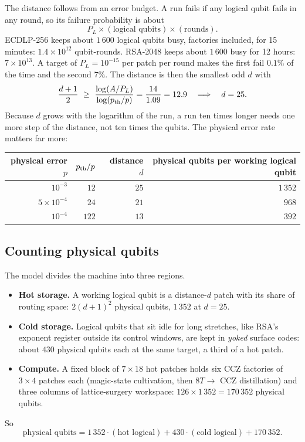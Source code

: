 The distance follows from an error budget. A run fails if any logical qubit fails in any round, so
its failure probability is about
\[ P_L\times(\text{logical qubits})\times(\text{rounds}) . \]
ECDLP-256 keeps about $1\,600$ logical qubits busy, factories included, for 15 minutes:
$1.4\times10^{12}$ qubit-rounds. RSA-2048 keeps about $1\,600$ busy for 12 hours:
$7\times10^{13}$. A target of $P_L=10^{-15}$ per patch per round makes the first fail $0.1\%$ of
the time and the second $7\%$. The distance is then the smallest odd $d$ with
\[ \frac{d+1}{2}\ \ge\ \frac{\log(A/P_L)}{\log(p_{\rm th}/p)}=\frac{14}{1.09}=12.9
   \quad\Longrightarrow\quad d=25 . \]
Because $d$ grows with the logarithm of the run, a run ten times longer needs one more step of the
distance, not ten times the qubits. The physical error rate matters far more:

\begin{center}\small
\begin{tabular}{rrrr}
\toprule
physical error $p$ & $p_{\rm th}/p$ & distance $d$ & physical qubits per working logical qubit\\
\midrule
$10^{-3}$ & $12$ & $25$ & $1\,352$\\
$5\times10^{-4}$ & $24$ & $21$ & $968$\\
$10^{-4}$ & $122$ & $13$ & $392$\\
\bottomrule
\end{tabular}
\end{center}

\subsection{Counting physical qubits}

The model divides the machine into three regions.
\begin{itemize}\setlength\itemsep{2pt}
\item \textbf{Hot storage.} A working logical qubit is a distance-$d$ patch with its share of
routing space: $2(d+1)^2$ physical qubits, $1\,352$ at $d=25$.
\item \textbf{Cold storage.} Logical qubits that sit idle for long stretches, like RSA's exponent
register outside its control windows, are kept in \emph{yoked} surface codes: about $430$ physical
qubits each at the same target, a third of a hot patch.
\item \textbf{Compute.} A fixed block of $7\times18$ hot patches holds six CCZ factories of
$3\times4$ patches each (magic-state cultivation, then $8T\to$ CCZ distillation) and three columns of
lattice-surgery workspace: $126\times1\,352=170\,352$ physical qubits.
\end{itemize}
So
\[ \text{physical qubits}=1\,352\cdot(\text{hot logical})+430\cdot(\text{cold logical})+170\,352 . \]

